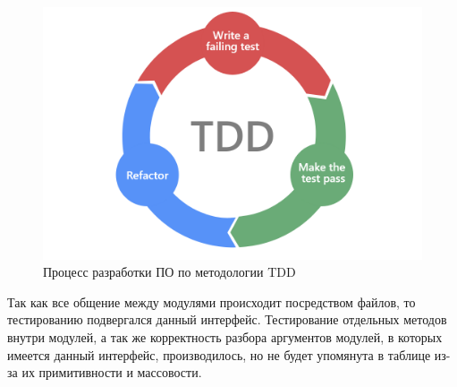 \begin{figure}[!hbtp]
    \includegraphics[width=\textwidth,height=\textheight,keepaspectratio]{images/TDD.png}
    \caption{Процесс разработки ПО по методологии TDD\label{fig:tdd}}
\end{figure}

Так как все общение между модулями происходит посредством файлов, то тестированию
подвергался данный интерфейс. Тестирование отдельных методов внутри модулей,
а так же корректность разбора аргументов модулей,
в которых имеется данный интерфейс, производилось, но не будет упомянута
в таблице из-за их примитивности и массовости.

